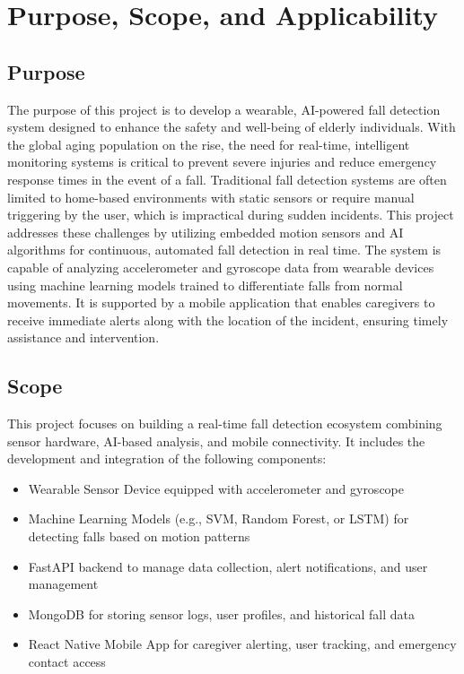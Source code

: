 \documentclass[a4paper, 12pt]{report}
\begin{document}
\section{Purpose, Scope, and Applicability}

\subsection{Purpose}
The purpose of this project is to develop a wearable, AI-powered fall detection system designed to enhance the safety and well-being of elderly individuals. With the global aging population on the rise, the need for real-time, intelligent monitoring systems is critical to prevent severe injuries and reduce emergency response times in the event of a fall.
Traditional fall detection systems are often limited to home-based environments with static sensors or require manual triggering by the user, which is impractical during sudden incidents. This project addresses these challenges by utilizing embedded motion sensors and AI algorithms for continuous, automated fall detection in real time.
The system is capable of analyzing accelerometer and gyroscope data from wearable devices using machine learning models trained to differentiate falls from normal movements. It is supported by a mobile application that enables caregivers to receive immediate alerts along with the location of the incident, ensuring timely assistance and intervention.
\subsection{Scope}
This project focuses on building a real-time fall detection ecosystem combining sensor hardware, AI-based analysis, and mobile connectivity. It includes the development and integration of the following components:

\begin{itemize}[itemsep=-4pt]
    \item Wearable Sensor Device equipped with accelerometer and gyroscope

    \item Machine Learning Models (e.g., SVM, Random Forest, or LSTM) for detecting falls based on motion patterns

    \item  FastAPI backend to manage data collection, alert notifications, and user management

    \item MongoDB for storing sensor logs, user profiles, and historical fall data
    
    \item React Native Mobile App for caregiver alerting, user tracking, and emergency contact access
\end{itemize}
\end{document}
